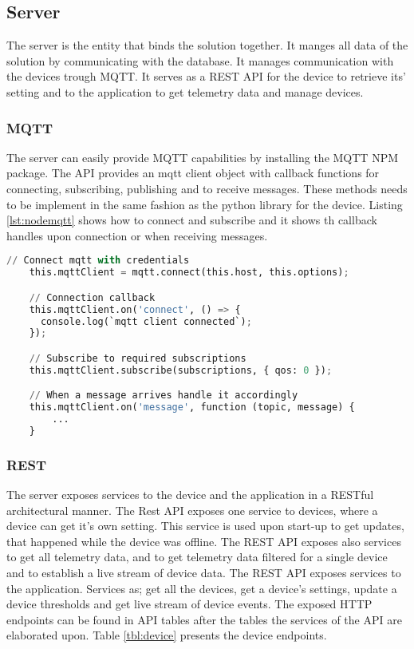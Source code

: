 \subsection{Server}
The server is the entity that binds the solution together. It manges all data of the solution by communicating with the database. It manages communication with the devices trough MQTT. It serves as a REST API for the device to retrieve its' setting and to the application to get telemetry data and manage devices. 

\subsubsection{MQTT}
The server can easily provide MQTT capabilities by installing the MQTT NPM package. The API provides an mqtt client object with callback functions for connecting, subscribing, publishing and to receive messages. These methods needs to be implement in the same fashion as the python library for the device. Listing \ref{lst:nodemqtt} shows how to connect and subscribe and it shows th callback handles upon connection or when receiving messages. 

\begin{lstlisting}[language=Python, caption=Node.js MQTT, label={lst:nodemqtt}, basicstyle=\tiny]
    // Connect mqtt with credentials
    this.mqttClient = mqtt.connect(this.host, this.options);

    // Connection callback
    this.mqttClient.on('connect', () => {
      console.log(`mqtt client connected`);
    });

    // Subscribe to required subscriptions
    this.mqttClient.subscribe(subscriptions, { qos: 0 });

    // When a message arrives handle it accordingly
    this.mqttClient.on('message', function (topic, message) {
        ...
    }
\end{lstlisting}

\subsubsection{REST}
The server exposes services to the device and the application in a RESTful architectural manner. The Rest API exposes one service to devices, where a device can get it's own setting. This service is used upon start-up to get updates, that happened while the device was offline. 
The REST API exposes also services to get all telemetry data, and to get telemetry data filtered for a single device and to establish a live stream of device data. 
The REST API exposes services to the application. Services as; get all the devices, get a device's settings, update a device thresholds and get live stream of device events. The exposed HTTP endpoints can be found in API tables after the tables the services of the API are elaborated upon. Table \ref{tbl:device} presents the device endpoints. 


